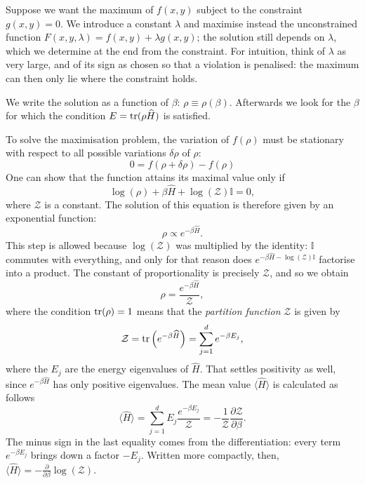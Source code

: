 \begin{greybox}
	Suppose we want the maximum of $f(x,y)$ subject to the constraint $g(x,y)=0$. We introduce a constant $\lambda$ and maximise instead the unconstrained function $F(x,y,\lambda) = f(x,y) + \lambda g(x,y)$; the solution still depends on $\lambda$, which we determine at the end from the constraint. For intuition, think of $\lambda$ as very large, and of its sign as chosen so that a violation is penalised: the maximum can then only lie where the constraint holds.
\end{greybox}

We write the solution as a function of $\beta$: $\rho \equiv \rho(\beta)$. Afterwards we look for the $\beta$ for which the condition $E=\operatorname{tr}(\rho \widehat{H})$ is satisfied. 

To solve the maximisation problem, the variation of $f(\rho)$ must be stationary with respect to all possible variations $\delta \rho$ of $\rho$:
\begin{equation}
	0= f(\rho + \delta\rho) -f(\rho)
\end{equation}
One can show that the function attains its maximal value only if
\begin{equation}
	\log(\rho) + \beta \widehat{H} + \log(\mathcal{Z})\mathbb{I} = 0,
\end{equation}
where $\mathcal{Z}$ is a constant.
The solution of this equation is therefore given by an exponential function:
\begin{equation}
	\rho \propto e^{-\beta \widehat{H}}.
\end{equation}
This step is allowed because $\log(\mathcal{Z})$ was multiplied by the identity: $\mathbb{I}$ commutes with everything, and only for that reason does $e^{-\beta \widehat{H}-\log(\mathcal{Z})\mathbb{I}}$ factorise into a product.
The constant of proportionality is precisely $\mathcal{Z}$, and so we obtain
\begin{equation}
	\rho = \frac{e^{-\beta \widehat{H}}}{\mathcal{Z}},
\end{equation}
where the condition $\operatorname{tr}(\rho) = 1$ means that the \emph{partition function} $\mathcal{Z}$ is given by
\begin{equation}
	\mathcal{Z} = \operatorname{tr}\left(e^{-\beta \widehat{H}}\right) = \sum_{j=1}^d e^{-\beta E_j},
\end{equation}
where the $E_j$ are the energy eigenvalues of $\widehat{H}$. That settles positivity as well, since $e^{-\beta \widehat{H}}$ has only positive eigenvalues. The mean value $\langle \widehat{H}\rangle$ is calculated as follows
\begin{equation}
	\langle \widehat{H}\rangle = \sum_{j=1}^d E_j \frac{e^{-\beta E_j}}{\mathcal{Z}} = -\frac{1}{\mathcal{Z}}\frac{\partial \mathcal{Z}}{\partial \beta}.
\end{equation}
The minus sign in the last equality comes from the differentiation: every term $e^{-\beta E_j}$ brings down a factor $-E_j$. Written more compactly, then, $\langle \widehat{H}\rangle = -\frac{\partial}{\partial \beta}\log(\mathcal{Z})$.


